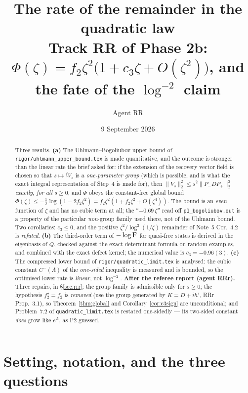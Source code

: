 \documentclass[11pt]{article}
\title{The rate of the remainder in the quadratic law\\
\large Track RR of Phase 2b: $\Phi(\zeta)=f_2\zeta^2\bigl(1+c_3\zeta+O(\zeta^2)\bigr)$,
and the fate of the $\log^{-2}$ claim}
\author{Agent RR}
\date{9 September 2026}
\newcommand{\Wt}{\widetilde W}
\newcommand{\Pp}{P_+}\newcommand{\Pm}{P_-}
\newcommand{\norm}[1]{\lVert#1\rVert}
\begin{document}
\maketitle

\begin{abstract}\noindent
Three results.  \textbf{(a)} The Uhlmann--Bogoliubov upper bound of
\texttt{rigor/uhlmann\_upper\_bound.tex} is made quantitative, and the outcome is stronger than
the linear rate the brief asked for: if the extension of the recovery vector field is chosen so that
$s\mapsto\Wt_s$ is a \emph{one-parameter group} (which is possible, and is what the exact integral
representation of Step~4 is made for), then $\norm{V_s}_2^2\le s^2\norm{\Pm D\Pp}_2^2$
\emph{exactly, for all $s\ge0$}, and $\Phi$ obeys the constant-free global bound
$\Phi(\zeta)\le-\frac12\log(1-2f_2\zeta^2)=f_2\zeta^2(1+f_2\zeta^2+O(\zeta^4))$.  The bound is an
\emph{even} function of $\zeta$ and has no cubic term at all; the ``$-0.69\,\zeta$'' read off
\texttt{p1\_bogoliubov.out} is a property of the particular \emph{non}-group family used there,
not of the Uhlmann bound.  Two corollaries:
$c_3\le0$, and the positive $\zeta^2/\log^2(1/\zeta)$ remainder of Note~5 Cor.~4.2 is
\emph{refuted}.  \textbf{(b)} The third-order term of $-\log\operatorname{F}$ for quasi-free states is derived
in the eigenbasis of $Q$, checked against the exact determinant formula on random examples, and
combined with the exact defect kernel; the numerical value is $c_3=-0.96(3)$.  \textbf{(c)} The
compressed lower bound of \texttt{rigor/quadratic\_limit.tex} is analysed: the cubic constant
$C^-(\Lambda)$ of the \emph{one-sided} inequality is measured and is bounded, so the optimised
lower rate is \emph{linear}, not $\log^{-2}$.
\medskip\noindent\textbf{After the referee report (agent RRr).}  Three repairs, in
\S\ref{sec:rrr}: the group family is admissible only for $s\ge0$; the hypothesis $f_2^\star=f_2$ is
\emph{removed} (use the group generated by $K=D+ih'$, RRr Prop.~3.1), so
Theorem~\ref{thm:global} and Corollary~\ref{cor:c3sign} are unconditional; and Problem~7.2 of
\texttt{quadratic\_limit.tex} is restated one-sidedly --- its two-sided constant \emph{does} grow
like $e^\Lambda$, as P2 guessed.
\end{abstract}

\tableofcontents

\section{Setting, notation, and the three questions}\label{sec:setting}
\end{document}
